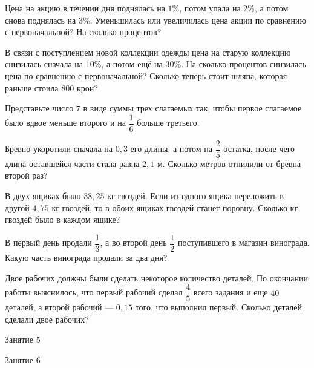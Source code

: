 \begin{class}[number=4]
	\begin{listofex}
		\item Цена на акцию в течении дня поднялась на \(1\%\), потом упала на \(2\%\), а потом снова поднялась на \(3\%\). Уменьшилась или увеличилась цена акции по сравнению с первоначальной? На сколько процентов?
		\item В связи с поступлением новой коллекции одежды цена на старую коллекцию снизилась сначала на \(10\%\), а потом ещё на \(30\%\). На сколько процентов снизилась цена по сравнению с первоначальной? Сколько теперь стоит шляпа, которая раньше стоила \(800\) крон?
		\item Представьте число \(7\) в виде суммы трех слагаемых так, чтобы первое слагаемое было вдвое меньше второго и на \(\dfrac{1}{6}\) больше третьего.
		\item Бревно укоротили сначала на \(0,3\) его длины, а потом на \(\dfrac{2}{5}\) остатка, после чего длина оставшейся части стала равна \(2,1\) м. Сколько метров отпилили от бревна второй раз?
		\item В двух ящиках было \(38,25\) кг гвоздей. Если из одного ящика переложить в другой \(4,75\) кг гвоздей, то в обоих ящиках гвоздей станет поровну. Сколько кг гвоздей было в каждом ящике?
		\item В первый день продали \(\dfrac{1}{3}\), а во второй день \(\dfrac{1}{2}\) поступившего в магазин винограда. Какую часть винограда продали за два дня?
		\item Двое рабочих должны были сделать некоторое количество деталей. По окончании работы выяснилось, что первый рабочий сделал \(\dfrac{4}{5}\) всего задания и еще \(40\) деталей, а второй рабочий --- \(0,15\) того, что выполнил первый. Сколько деталей сделали двое рабочих?
	\end{listofex}
\end{class}

\begin{class}[number=5]
	\begin{listofex}
		\item Занятие 5
	\end{listofex}
\end{class}

\begin{class}[number=6]
	\begin{listofex}
		\item Занятие 6
	\end{listofex}
\end{class}

